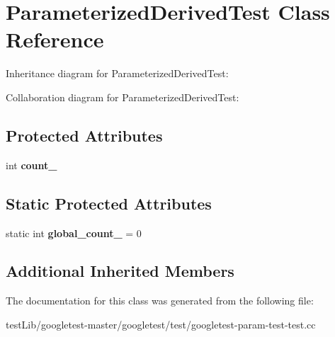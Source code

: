 \hypertarget{classParameterizedDerivedTest}{}\section{Parameterized\+Derived\+Test Class Reference}
\label{classParameterizedDerivedTest}


Inheritance diagram for Parameterized\+Derived\+Test\+:


Collaboration diagram for Parameterized\+Derived\+Test\+:
\subsection*{Protected Attributes}
\begin{DoxyCompactItemize}
\item 
\mbox{\label{classParameterizedDerivedTest_ad8a2968265e7477c13585d17bbd0492c}} 
int {\bfseries count\+\_\+}
\end{DoxyCompactItemize}
\subsection*{Static Protected Attributes}
\begin{DoxyCompactItemize}
\item 
\mbox{\label{classParameterizedDerivedTest_ab6c067a099764a9d58b5f2e8ebcb5d0f}} 
static int {\bfseries global\+\_\+count\+\_\+} = 0
\end{DoxyCompactItemize}
\subsection*{Additional Inherited Members}


The documentation for this class was generated from the following file\+:\begin{DoxyCompactItemize}
\item 
test\+Lib/googletest-\/master/googletest/test/googletest-\/param-\/test-\/test.\+cc\end{DoxyCompactItemize}
